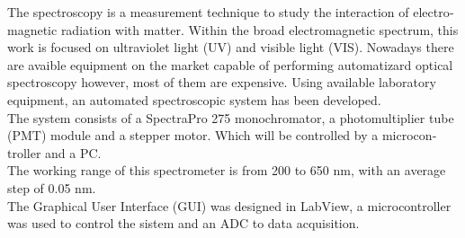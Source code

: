 \begin{otherlanguage}{english}
The spectroscopy is a measurement technique to study the interaction of electromagnetic radiation with matter.
Within the broad electromagnetic spectrum, this work is focused on ultraviolet light (UV) and visible light (VIS). Nowadays there are avaible equipment on the market capable of performing automatizard optical spectroscopy however, most of them are expensive. Using available  laboratory equipment, an automated spectroscopic system has been developed. \\
The system consists of a SpectraPro 275 monochromator, a photomultiplier tube (PMT) module and a stepper motor. Which will be controlled by a microcontroller and a PC. \\
The working range of this spectrometer is from 200 to 650 nm, with an average step of 0.05 nm. \\
The Graphical User Interface (GUI) was designed in LabView, a microcontroller was used to control the sistem and an ADC to data acquisition.

\end{otherlanguage}{}